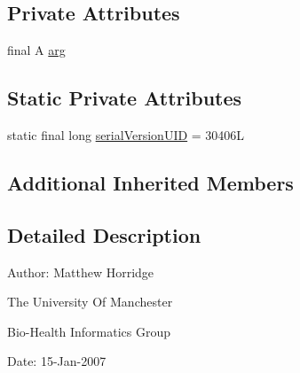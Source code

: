 \subsection*{Private Attributes}
\begin{DoxyCompactItemize}
\item 
final A \hyperlink{classuk_1_1ac_1_1manchester_1_1cs_1_1owl_1_1owlapi_1_1_s_w_r_l_unary_atom_impl_3_01_a_01extends_01_s_w_r_l_argument_01_4_a5fe8279ab169b4c8984ed60d059d6ca4}{arg}
\end{DoxyCompactItemize}
\subsection*{Static Private Attributes}
\begin{DoxyCompactItemize}
\item 
static final long \hyperlink{classuk_1_1ac_1_1manchester_1_1cs_1_1owl_1_1owlapi_1_1_s_w_r_l_unary_atom_impl_3_01_a_01extends_01_s_w_r_l_argument_01_4_a988bd61bdb34fa7a04bbed4b82380123}{serial\-Version\-U\-I\-D} = 30406\-L
\end{DoxyCompactItemize}
\subsection*{Additional Inherited Members}


\subsection{Detailed Description}
Author\-: Matthew Horridge\par
 The University Of Manchester\par
 Bio-\/\-Health Informatics Group\par
 Date\-: 15-\/\-Jan-\/2007\par
\par
 

